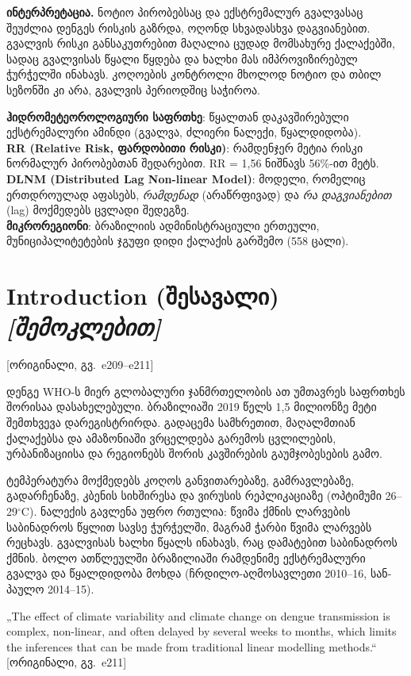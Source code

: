 \documentclass[11pt,a4paper]{article}
\newcommand{\pg}[1]{{\small\color{gray}[ორიგინალი, გვ.~#1]}}
\begin{document}
\textbf{ინტერპრეტაცია.} ნოტიო პირობებსაც და ექსტრემალურ გვალვასაც შეუძლია დენგეს რისკის გაზრდა, ოღონდ სხვადასხვა დაგვიანებით.
გვალვის რისკი განსაკუთრებით მაღალია ცუდად მომსახურე ქალაქებში, სადაც გვალვისას წყალი წყდება და ხალხი მას იმპროვიზირებულ
ჭურჭელში ინახავს. კოღოების კონტროლი მხოლოდ ნოტიო და თბილ სეზონში კი არა, გვალვის პერიოდშიც საჭიროა.

\begin{termin}
\textbf{ჰიდრომეტეოროლოგიური საფრთხე}: წყალთან დაკავშირებული ექსტრემალური ამინდი (გვალვა, ძლიერი ნალექი, წყალდიდობა).\\
\textbf{RR (Relative Risk, ფარდობითი რისკი)}: რამდენჯერ მეტია რისკი ნორმალურ პირობებთან შედარებით. RR = 1,56 ნიშნავს 56\%-ით მეტს.\\
\textbf{DLNM (Distributed Lag Non-linear Model)}: მოდელი, რომელიც ერთდროულად აფასებს, \textit{რამდენად} (არაწრფივად) და
\textit{რა დაგვიანებით} (lag) მოქმედებს ცვლადი შედეგზე.\\
\textbf{მიკრორეგიონი}: ბრაზილიის ადმინისტრაციული ერთეული, მუნიციპალიტეტების ჯგუფი დიდი ქალაქის გარშემო (558 ცალი).
\end{termin}

\section{Introduction (შესავალი) \textit{[შემოკლებით]}} \pg{e209--e211}

დენგე WHO-ს მიერ გლობალური ჯანმრთელობის ათ უმთავრეს საფრთხეს შორისაა დასახელებული. ბრაზილიაში 2019 წელს 1,5 მილიონზე მეტი
შემთხვევა დარეგისტრირდა. გადაცემა სამხრეთით, მაღალმთიან ქალაქებსა და ამაზონიაში ვრცელდება გარემოს ცვლილების, ურბანიზაციისა
და რეგიონებს შორის კავშირების გაუმჯობესების გამო.

ტემპერატურა მოქმედებს კოღოს განვითარებაზე, გამრავლებაზე, გადარჩენაზე, კბენის სიხშირესა და ვირუსის რეპლიკაციაზე (ოპტიმუმი
26--29$^\circ$C). ნალექის გავლენა უფრო რთულია: წვიმა ქმნის ლარვების საბინადროს წყლით სავსე ჭურჭელში, მაგრამ ჭარბი წვიმა
ლარვებს რეცხავს. გვალვისას ხალხი წყალს ინახავს, რაც დამატებით საბინადროს ქმნის. ბოლო ათწლეულში ბრაზილიაში რამდენიმე
ექსტრემალური გვალვა და წყალდიდობა მოხდა (ჩრდილო-აღმოსავლეთი 2010--16, სან-პაულო 2014--15).

\begin{citat}
„The effect of climate variability and climate change on dengue transmission is complex, non-linear, and often delayed by several
weeks to months, which limits the inferences that can be made from traditional linear modelling methods.“ \pg{e211}
\end{citat}
\end{document}
